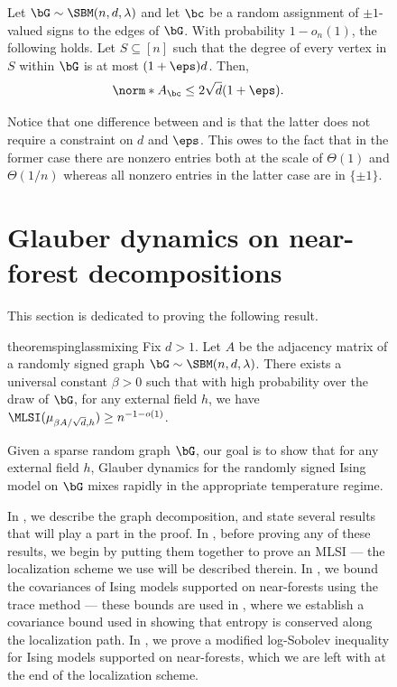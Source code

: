 \documentclass[11pt,letterpaper]{article}
\begin{document}
\begin{figure}
\begin{lemma}
        Let $\bG\sim \SBM(n, d, \lambda)$ and let $\bc$ be a random assignment of $\pm1$-valued signs to the edges of $\bG$. With probability $1-o_n(1)$, the following holds.
        Let $S\subseteq[n]$ such that the degree of every vertex in $S$ within $\bG$ is at most $(1+\eps)d$.
        Then,
        \[
            \norm*{A_{\bc}} \le 2\sqrt{d}(1+\eps).
        \]
    \end{lemma}
    \begin{remark}
        Notice that one difference between  and  is that the latter does not require a constraint on $d$ and $\eps$.
        This owes to the fact that in the former case there are nonzero entries both at the scale of $\Theta(1)$ and $\Theta(1/n)$ whereas all nonzero entries in the latter case are in $\{\pm1\}$.
    \end{remark}

    


\section{Glauber dynamics on near-forest decompositions}
\label{sec:spinglass}

This section is dedicated to proving the following result.

\begin{restatable}{theorem}{spinglassmixing}
    \label{thm:main-mixing}
    Fix $d > 1$. Let $A$ be the adjacency matrix of a randomly signed graph $\bG \sim \SBM(n, d, \lambda)$. There exists a universal constant $\beta > 0$ such that with high probability over the draw of $\bG$, for any external field $h$, we have $\MLSI(\mu_{\beta A/\sqrt{d}, h}) \ge n^{-1 - o(1)}$. 
\end{restatable}
    
Given a sparse random graph $\bG$, our goal is to show that for any external field $h$, Glauber dynamics for the randomly signed Ising model on $\bG$ mixes rapidly in the appropriate temperature regime.

In , we describe the graph decomposition, and state several results that will play a part in the proof. In , before proving any of these results, we begin by putting them together to prove an MLSI --- the localization scheme we use will be described therein. In , we bound the covariances of Ising models supported on near-forests using the trace method --- these bounds are used in , where we establish a covariance bound used in showing that entropy is conserved along the localization path. In , we prove a modified log-Sobolev inequality for Ising models supported on near-forests, which we are left with at the end of the localization scheme.


\end{figure}
\end{document}
